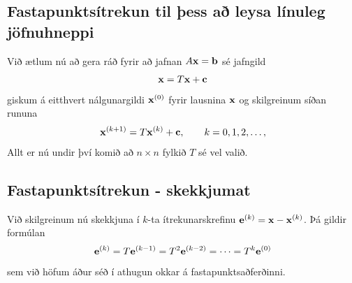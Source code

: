 \documentclass[letterpaper,10pt,icelandic]{sphinxmanual}
\begin{document}
\subsection{Fastapunktsítrekun til þess að leysa línuleg jöfnuhneppi}
\label{kafli08:fastapunktsitrekun-til-ess-a-leysa-linuleg-jofnuhneppi}
Við ætlum nú að gera ráð fyrir að jafnan
\(A\mbox{${\bf x}$}=\mbox{${\bf b}$}\) sé jafngild
\begin{gather}
\begin{split}\mbox{${\bf x}$}=T\mbox{${\bf x}$}+\mbox{${\bf c}$}\end{split}\notag
\end{gather}
giskum á eitthvert nálgunargildi \(\mbox{${\bf x}$}^{(0)}\) fyrir
lausnina \(\mbox{${\bf x}$}\) og skilgreinum síðan rununa
\begin{gather}
\begin{split}\mbox{${\bf x}$}^{(k+1)}=T\mbox{${\bf x}$}^{(k)}+\mbox{${\bf c}$}, \qquad k=0,1,2,\dots,\end{split}\notag
\end{gather}
Allt er nú undir því komið að \(n\times n\) fylkið \(T\) sé vel
valið.


\subsection{Fastapunktsítrekun - skekkjumat}
\label{kafli08:fastapunktsitrekun-skekkjumat}
Við skilgreinum nú skekkjuna í \(k\)-ta ítrekunarskrefinu
\(\mbox{${\bf e}$}^{(k)}=\mbox{${\bf x}$}-\mbox{${\bf x}$}^{(k)}\).
Þá gildir formúlan
\begin{gather}
\begin{split}\mbox{${\bf e}$}^{(k)}=T\mbox{${\bf e}$}^{(k-1)}=T^2\mbox{${\bf e}$}^{(k-2)}=\cdots=T^{k}\mbox{${\bf e}$}^{(0)}\end{split}\notag
\end{gather}
sem við höfum áður séð í athugun okkar á fastapunktsaðferðinni.
\end{document}
